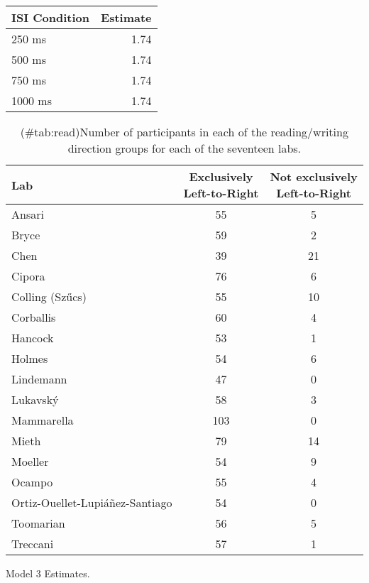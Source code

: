 \begin{appendix}
\begin{table}[!p]
\begin{subtable}{\textwidth}
\begin{table}[H]
\begin{tabular}{lr}
\toprule
ISI Condition & Estimate\\
\midrule
250 ms & 1.74\\
500 ms & 1.74\\
750 ms & 1.74\\
1000 ms & 1.74\\
\bottomrule
\end{tabular}\endgroup{}
\end{table}
\end{subtable}
\end{table}

\begin{table}

\caption{(\#tab:read)Number of participants in each of the reading/writing direction groups for each of the seventeen labs.}
\centering
\begin{tabular}[t]{lcc}
\toprule
Lab & \makecell[c]{Exclusively\\Left-to-Right} & \makecell[c]{Not exclusively\\Left-to-Right}\\
\midrule
Ansari & 55 & 5\\
Bryce & 59 & 2\\
Chen & 39 & 21\\
Cipora & 76 & 6\\
Colling (Szűcs) & 55 & 10\\
Corballis & 60 & 4\\
Hancock & 53 & 1\\
Holmes & 54 & 6\\
Lindemann & 47 & 0\\
Lukavský & 58 & 3\\
Mammarella & 103 & 0\\
Mieth & 79 & 14\\
Moeller & 54 & 9\\
Ocampo & 55 & 4\\
Ortiz-Ouellet-Lupiáñez-Santiago & 54 & 0\\
Toomarian & 56 & 5\\
Treccani & 57 & 1\\
\bottomrule
\end{tabular}
\end{table}

\begin{table}[!p]
\caption{\label{tab:mod3}Model 3 Estimates.}
\begin{subtable}{\textwidth}
\centering
\begin{table}[H]\centering\begingroup\fontsize{10}{12}\selectfont


\end{table}
\end{subtable}
\end{table}
\end{appendix}
